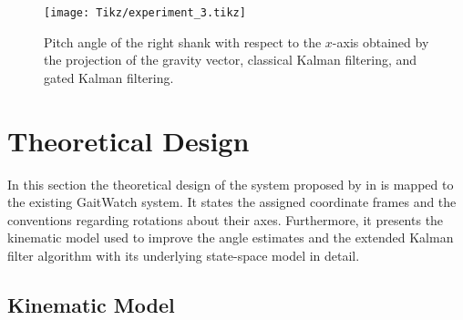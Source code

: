 \begin{figure}
	\centering
	\setlength\figureheight{7cm} 
	\setlength\figurewidth{\textwidth}
	\texttt{[image: Tikz/experiment\_3.tikz]}
	\caption{Pitch angle of the right shank with respect to the $x$-axis obtained by the projection of the gravity vector, classical Kalman filtering, and gated Kalman filtering.}
	\label{fig:experiment_3}
\end{figure}

%

\section{Theoretical Design}\label{sec:theoretical_design}

In this section the theoretical design of the system proposed by \citeauthor{bennett_motion_2014} in \cite{bennett_motion_2014} is mapped to the existing GaitWatch system. It states the assigned coordinate frames and the conventions regarding rotations about their axes. Furthermore, it presents the kinematic model used to improve the angle estimates and the extended Kalman filter algorithm with its underlying state-space model in detail.

\subsection{Kinematic Model}

